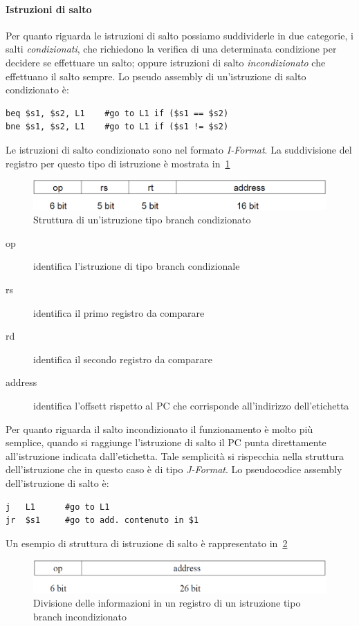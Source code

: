 \paragraph{Istruzioni di salto}
Per quanto riguarda le istruzioni di salto possiamo suddividerle in due categorie, i salti \emph{condizionati}, che richiedono la verifica di una determinata condizione per decidere se effettuare un salto; oppure istruzioni di salto \emph{incondizionato} che effettuano il salto sempre. 
Lo pseudo assembly di un'istruzione di salto condizionato è:
\begin{verbatim}
beq $s1, $s2, L1	#go to L1 if ($s1 == $s2)
bne $s1, $s2, L1	#go to L1 if ($s1 != $s2)
\end{verbatim}
Le istruzioni di salto condizionato sono nel formato \emph{I-Format}. La suddivisione del registro per questo tipo  di istruzione è mostrata in \figurename\,\ref{fig:condbranch}\\
\begin{figure}[htb]
\centering
\includegraphics[scale=0.4]{img/condbranch.png}
\caption{Struttura di un'istruzione tipo branch condizionato}\label{fig:condbranch}
\end{figure}
\begin{description}
\item[op] identifica l'istruzione di tipo branch condizionale
\item[rs] identifica il primo registro da comparare
\item[rd] identifica il secondo registro da comparare
\item[address] identifica l'offsett rispetto al PC che corrisponde all'indirizzo dell'etichetta
\end{description}
Per quanto riguarda il salto incondizionato il funzionamento è molto più semplice, quando si raggiunge l'istruzione di salto il PC punta direttamente all'istruzione indicata dall'etichetta. Tale semplicità si rispecchia nella struttura dell'istruzione che in questo caso è di tipo \emph{J-Format}. 
Lo pseudocodice assembly dell'istruzione di salto è:
\begin{verbatim}
j	L1		#go to L1
jr	$s1		#go to add. contenuto in $1
\end{verbatim}
Un esempio di struttura di istruzione di salto è rappresentato in \figurename\,\ref{fig:uncondbranch} 
\begin{figure}[htb]
\centering
\includegraphics[scale=0.4]{img/uncondbranch.png}
\caption{Divisione delle informazioni in un registro di un istruzione tipo branch incondizionato}\label{fig:uncondbranch}
\end{figure}
